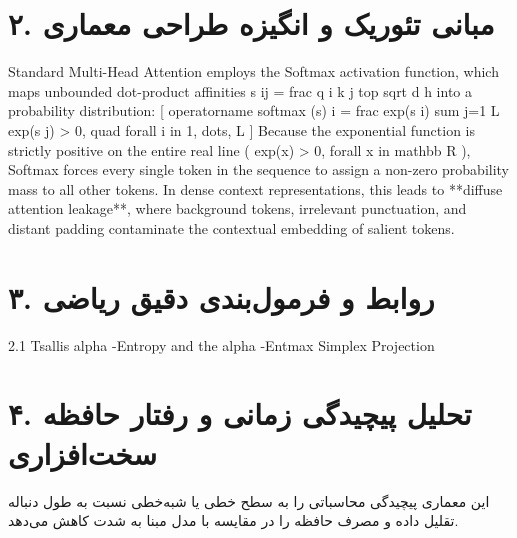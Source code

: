 \documentclass[12pt,a4paper]{article}
\begin{document}
\section*{۲. مبانی تئوریک و انگیزه طراحی معماری}
Standard Multi-Head Attention employs the Softmax activation function, which maps unbounded dot-product affinities s ij = frac q i k j top sqrt d h into a probability distribution: [ operatorname softmax (s) i = frac exp(s i) sum j=1 L exp(s j) > 0, quad forall i in 1, dots, L ] Because the exponential function is strictly positive on the entire real line ( exp(x) > 0, forall x in mathbb R ), Softmax forces every single token in the sequence to assign a non-zero probability mass to all other tokens. In dense context representations, this leads to **diffuse attention leakage**, where background tokens, irrelevant punctuation, and distant padding contaminate the contextual embedding of salient tokens.

\section*{۳. روابط و فرمول‌بندی دقیق ریاضی}
2.1 Tsallis alpha -Entropy and the alpha -Entmax Simplex Projection

\section*{۴. تحلیل پیچیدگی زمانی و رفتار حافظه سخت‌افزاری}
این معماری پیچیدگی محاسباتی را به سطح خطی یا شبه‌خطی نسبت به طول دنباله تقلیل داده و مصرف حافظه را در مقایسه با مدل مبنا به شدت کاهش می‌دهد.
\end{document}

